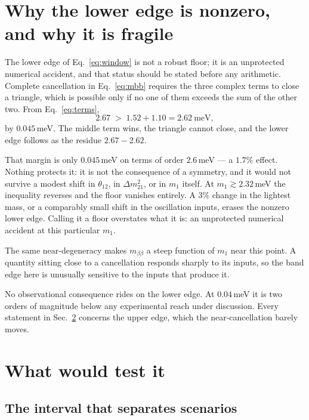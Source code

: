 \documentclass[aps,prd,twocolumn,superscriptaddress,nofootinbib,10pt]{revtex4-2}
\begin{document}
\section{Why the lower edge is nonzero, and why it is fragile}\label{sec:floor}

The lower edge of Eq.~\eqref{eq:window} is not a robust floor; it is an unprotected numerical
accident, and that status should be stated before any arithmetic. Complete cancellation in
Eq.~\eqref{eq:mbb} requires the three complex terms to close a triangle, which is possible only if
no one of them exceeds the sum of the other two. From Eq.~\eqref{eq:terms},
%
\begin{equation}
  2.67 \;>\; 1.52 + 1.10 = 2.62 \ \mathrm{meV},
  \label{eq:triangle}
\end{equation}
%
by $0.045\,$meV. The middle term wins, the triangle cannot close, and the lower edge follows as the
residue $2.67 - 2.62$.

That margin is only $0.045\,$meV on terms of order $2.6\,$meV --- a $1.7\%$ effect. Nothing
protects it: it is not the consequence of a symmetry, and it would not survive a modest shift in
$\theta_{12}$, in $\Delta m^2_{21}$, or in $m_1$ itself. At $m_1 \gtrsim 2.32\,$meV the inequality
reverses and the floor vanishes entirely. A $3\%$ change in the lightest mass, or a comparably small
shift in the oscillation inputs, erases the nonzero lower edge. Calling it a floor overstates what
it is: an unprotected numerical accident at this particular $m_1$.

The same near-degeneracy makes $m_{\beta\beta}$ a steep function of $m_1$ near this point. A quantity
sitting close to a cancellation responds sharply to its inputs, so the band edge here is unusually
sensitive to the inputs that produce it.

No observational consequence rides on the lower edge. At $0.04\,$meV it is two orders of magnitude
below any experimental reach under discussion. Every statement in Sec.~\ref{sec:test} concerns the
upper edge, which the near-cancellation barely moves.

\section{What would test it}\label{sec:test}

\subsection{The interval that separates scenarios}
\end{document}
